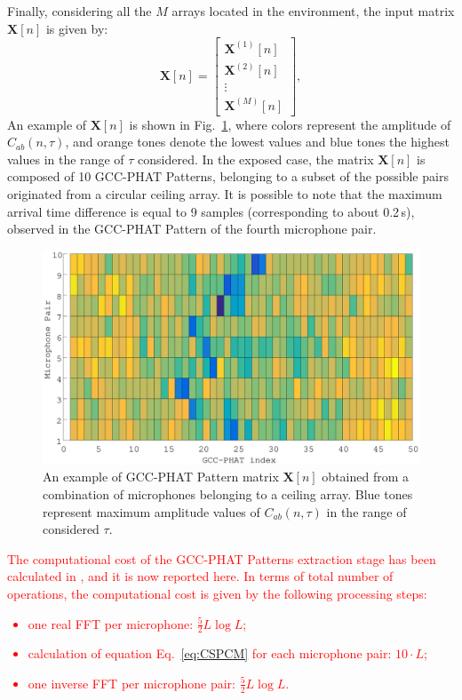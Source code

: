 \documentclass[review]{elsarticle}
\newcommand{\figref}[1]{Fig.~\ref{#1}}
\let\originaleqref=\eqref
\renewcommand{\eqref}{Eq.~\originaleqref}
\begin{document}
Finally, considering all the $M$ arrays located in the environment, the input matrix $\mathbf{X}[n]$ is given by:
\begin{equation}\label{eq:fx_matrix}
\mathbf{X}[n] =   \begin{bmatrix} \mathbf{X}^{(1)}[n] \\ \mathbf{X}^{(2)}[n] \\ \vdots\\ \mathbf{X}^{(M)}[n] \end{bmatrix},
\end{equation}
An example of $\mathbf{X}[n]$ is shown in \figref{fig:GCC-PATT}, where colors represent the amplitude of $C_{ab}(n,\tau)$, and orange tones denote the lowest values and blue tones the highest values in the range of $\tau$ considered. In the exposed case, the matrix $\mathbf{X}[n]$ is composed of 10 GCC-PHAT Patterns, belonging to a subset of the possible pairs originated from a circular ceiling array. It is possible to note that the maximum arrival time difference is equal to 9 samples (corresponding to about 0.2\,s), observed in the GCC-PHAT Pattern of the fourth microphone pair.

\begin{figure}[h]
	\centering
	\includegraphics[width=0.9\columnwidth]{imgs/GCC-PHAT-PATTERN}
	\caption{An example of GCC-PHAT Pattern matrix $\mathbf{X}[n]$ obtained from a combination of microphones belonging to a ceiling array. Blue tones represent maximum amplitude values of $C_{ab}(n,\tau)$ in the range of considered $\tau$.}
	\label{fig:GCC-PATT}
\end{figure}


\textcolor{red}{The computational cost of the GCC-PHAT Patterns extraction stage has been calculated in \cite{DoSY07}, and it is now reported here. In terms of total number of operations, the computational cost is given by the following processing steps:
\begin{itemize}
\item one real FFT per microphone: $\frac{5}{2} L \log L$;
\item calculation of equation \eqref{eq:CSPCM} for each microphone pair: $10\cdot L$;
\item one inverse FFT per microphone pair:  $ \frac{5}{2} L \log L$.
\end{itemize}}
\end{document}

